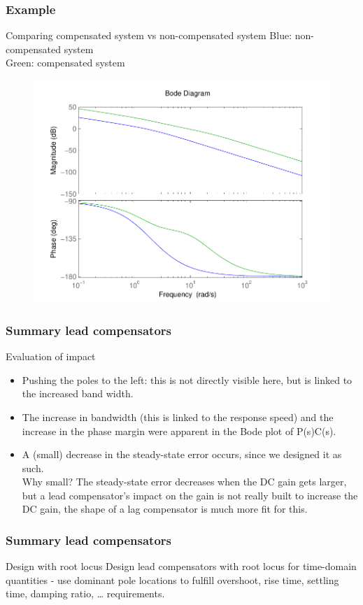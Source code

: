 \begin{frame}
	\frametitle{Example}
	\begin{block}{Comparing compensated system vs non-compensated system}
	Blue: non-compensated system \\
	Green: compensated system
	\begin{figure}
		\centering
		\includegraphics[width=0.5
		\linewidth]{bodesolutionexampleleadcomparing}
	\end{figure}
	\end{block}
\end{frame}

\begin{frame}
\frametitle{Summary lead compensators}
\begin{block}{Evaluation of impact}
\begin{itemize}
	\item Pushing the poles to the left: this is not directly visible here, but is linked to the increased band width.
	\item The increase in bandwidth (this is linked to the response speed) and the increase in the phase margin were apparent in the Bode plot of P(s)C(s).
	\item A (small) decrease in the steady-state error occurs, since we designed it as such. \\
	Why small? The steady-state error decreases when the DC gain gets larger, but a lead compensator’s impact on the gain is not really built to increase the DC gain, the shape of a lag compensator is much more fit for this.
\end{itemize}
\end{block}
\end{frame}

\begin{frame}
	\frametitle{Summary lead compensators}
	\begin{block}{Design with root locus}
	Design lead compensators with root locus for time-domain quantities  - use dominant pole locations to fulfill overshoot, rise time, settling time, damping ratio, … requirements.
	\end{block}
\end{frame}

